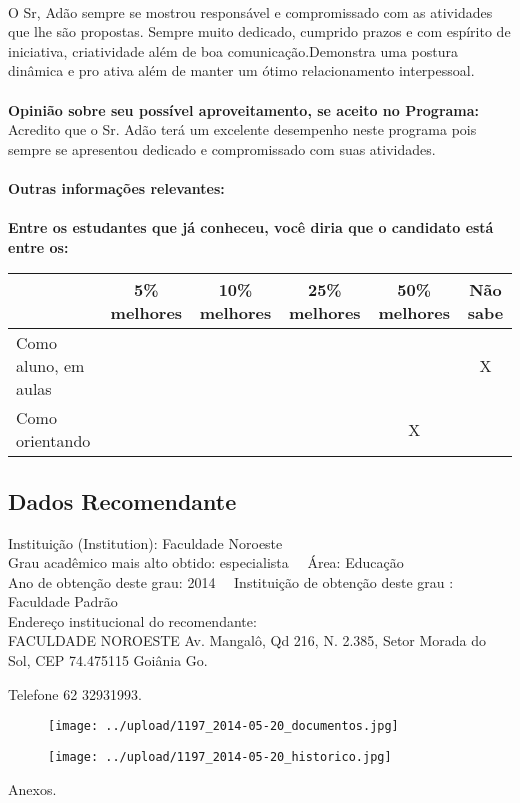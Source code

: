 \documentclass[11pt]{article}
\begin{document}
\\O Sr, Adão sempre se mostrou responsável e compromissado com as atividades que lhe são propostas. Sempre muito dedicado, cumprido prazos e com espírito de iniciativa, criatividade além de boa comunicação.Demonstra uma postura dinâmica e pro ativa além de manter um ótimo relacionamento interpessoal.\\
\\
\textbf{Opinião sobre seu possível aproveitamento, se aceito no Programa:}
\\Acredito que o Sr. Adão terá um excelente desempenho neste programa pois sempre se apresentou dedicado e compromissado com suas atividades.\\ 
\\
\textbf{Outras informações relevantes:} \\
\\[0.3cm]
\textbf{Entre os estudantes que já conheceu, você diria que o candidato está entre os:}
\\
\begin{tabular}{|l|c|c|c|c|c|}
\hline
 & 5\% melhores & 10\% melhores & 25\% melhores & 50\% melhores & Não sabe \\
\hline
Como aluno, em aulas &  &  &  &  & X\\
\hline
Como orientando &  &  &  & X & \\
\hline
\end{tabular}
\subsection*{Dados Recomendante} 
	Instituição (Institution): Faculdade Noroeste
\\ 
	Grau acadêmico mais alto obtido: especialista
	\ \ Área: Educação
	\\
	Ano de obtenção deste grau: 2014
	\ \ 
	Instituição de obtenção deste grau : Faculdade Padrão
	\\ 
	Endereço institucional do recomendante: \\ FACULDADE NOROESTE
Av. Mangalô, Qd 216, N. 2.385, Setor Morada do Sol, CEP 74.475115  Goiânia  Go.

Telefone 62 32931993.	
\begin{figure}[!htb]
\texttt{[image: ../upload/1197\_2014-05-20\_documentos.jpg]}
\end{figure}	
\begin{figure}[!htb]
\texttt{[image: ../upload/1197\_2014-05-20\_historico.jpg]}
\end{figure} 
\begin{center}
Anexos.
\end{center}
\end{document}
